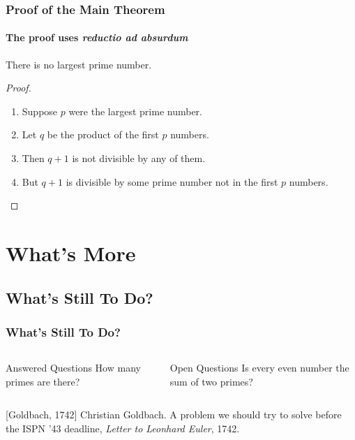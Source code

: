 \documentclass{beamer}
\begin{document}
\begin{frame}
    \frametitle{Proof of the Main Theorem}
    \framesubtitle{The proof uses \textit{reductio ad absurdum}}

    \begin{theorem}
        There is no largest prime number.
    \end{theorem}

    \begin{proof}
        \begin{enumerate}
            \item<1-| alert@1> Suppose $p$ were the largest prime number.
            \item<2-> Let $q$ be the product of the first $p$ numbers.
            \item<3-> Then $q + 1$ is not divisible by any of them.
            \item<1-> But $q + 1$ is divisible by some prime number not in the first $p$ numbers.\qedhere
        \end{enumerate}
    \end{proof}

\end{frame}

\section{What's More}

\subsection{What's Still To Do?}

\begin{frame}
    \frametitle{What's Still To Do?}

    \begin{columns}
        \begin{block}{Answered Questions}
            How many primes are there?
        \end{block}

        \begin{block}{Open Questions}
            Is every even number the sum of two primes?
            \cite{Goldbach1742}
        \end{block}
    \end{columns}

    \begin{thebibliography}{10}
        [Goldbach, 1742]
        Christian Goldbach.
        \newblock A problem we should try to solve before the ISPN '43 deadline,
        \newblock \emph{Letter to Leonhard Euler}, 1742.
    \end{thebibliography}
\end{frame}
\end{document}
